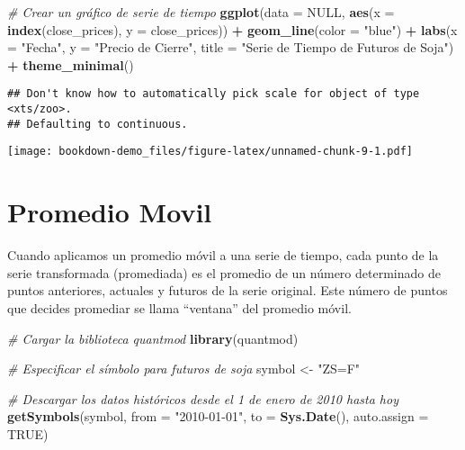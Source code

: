 \documentclass[
]{book}
\newenvironment{Shaded}{\begin{snugshade}}{\end{snugshade}}
\newcommand{\AttributeTok}[1]{\textcolor[rgb]{0.13,0.29,0.53}{#1}}
\newcommand{\CommentTok}[1]{\textcolor[rgb]{0.56,0.35,0.01}{\textit{#1}}}
\newcommand{\ConstantTok}[1]{\textcolor[rgb]{0.56,0.35,0.01}{#1}}
\newcommand{\FunctionTok}[1]{\textcolor[rgb]{0.13,0.29,0.53}{\textbf{#1}}}
\newcommand{\NormalTok}[1]{#1}
\newcommand{\OtherTok}[1]{\textcolor[rgb]{0.56,0.35,0.01}{#1}}
\newcommand{\SpecialCharTok}[1]{\textcolor[rgb]{0.81,0.36,0.00}{\textbf{#1}}}
\newcommand{\StringTok}[1]{\textcolor[rgb]{0.31,0.60,0.02}{#1}}
\begin{document}
\begin{Shaded}
\begin{Highlighting}[]
\CommentTok{\# Crear un gráfico de serie de tiempo}
\FunctionTok{ggplot}\NormalTok{(}\AttributeTok{data =} \ConstantTok{NULL}\NormalTok{, }\FunctionTok{aes}\NormalTok{(}\AttributeTok{x =} \FunctionTok{index}\NormalTok{(close\_prices), }\AttributeTok{y =}\NormalTok{ close\_prices)) }\SpecialCharTok{+}
  \FunctionTok{geom\_line}\NormalTok{(}\AttributeTok{color =} \StringTok{"blue"}\NormalTok{) }\SpecialCharTok{+}
  \FunctionTok{labs}\NormalTok{(}\AttributeTok{x =} \StringTok{"Fecha"}\NormalTok{, }\AttributeTok{y =} \StringTok{"Precio de Cierre"}\NormalTok{, }\AttributeTok{title =} \StringTok{"Serie de Tiempo de Futuros de Soja"}\NormalTok{) }\SpecialCharTok{+}
  \FunctionTok{theme\_minimal}\NormalTok{()}
\end{Highlighting}
\end{Shaded}

\begin{verbatim}
## Don't know how to automatically pick scale for object of type <xts/zoo>.
## Defaulting to continuous.
\end{verbatim}

\texttt{[image: bookdown-demo\_files/figure-latex/unnamed-chunk-9-1.pdf]}

\hypertarget{promedio-movil}{%
\chapter{Promedio Movil}\label{promedio-movil}}

Cuando aplicamos un promedio móvil a una serie de tiempo, cada punto de la serie transformada (promediada) es el promedio de un número determinado de puntos anteriores, actuales y futuros de la serie original. Este número de puntos que decides promediar se llama ``ventana'' del promedio móvil.

\begin{Shaded}
\begin{Highlighting}[]
\CommentTok{\# Cargar la biblioteca quantmod}
\FunctionTok{library}\NormalTok{(quantmod)}

\CommentTok{\# Especificar el símbolo para futuros de soja}
\NormalTok{symbol }\OtherTok{\textless{}{-}} \StringTok{"ZS=F"}

\CommentTok{\# Descargar los datos históricos desde el 1 de enero de 2010 hasta hoy}
\FunctionTok{getSymbols}\NormalTok{(symbol, }\AttributeTok{from =} \StringTok{"2010{-}01{-}01"}\NormalTok{, }\AttributeTok{to =} \FunctionTok{Sys.Date}\NormalTok{(), }\AttributeTok{auto.assign =} \ConstantTok{TRUE}\NormalTok{)}
\end{Highlighting}
\end{Shaded}
\end{document}
